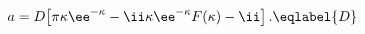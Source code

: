 \begin{equation}
a = D\bigl[\pi\kappa\ee^{-\kappa} -\ii\kappa\ee^{-\kappa}F(\kappa)
-\ii\bigr] \,.
\eqlabel{D}
\end{equation}

